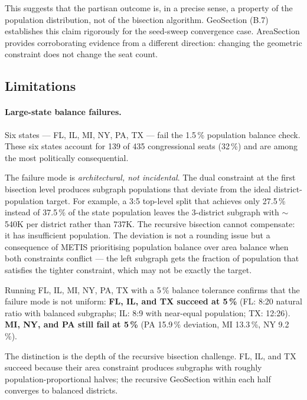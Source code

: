 This suggests that the partisan outcome is, in a precise sense, a property
of the population distribution, not of the bisection algorithm.
GeoSection (B.7) establishes this claim rigorously for the seed-sweep
convergence case.
AreaSection provides corroborating evidence from a different direction:
changing the geometric constraint does not change the seat count.

\subsection{Limitations}
\label{sec:limitations}

\paragraph{Large-state balance failures.}
Six states --- FL, IL, MI, NY, PA, TX --- fail the 1.5\,\% population balance
check.
These six states account for 139 of 435 congressional seats (32\,\%) and are
among the most politically consequential.

The failure mode is \emph{architectural, not incidental}.
The dual constraint at the first bisection level produces subgraph populations
that deviate from the ideal district-population target.
For example, a 3:5 top-level split that achieves only 27.5\,\% instead of
37.5\,\% of the state population leaves the 3-district subgraph with
$\sim$540K per district rather than 737K.
The recursive bisection cannot compensate: it has insufficient population.
The deviation is not a rounding issue but a consequence of METIS prioritising
population balance over area balance when both constraints conflict --- the
left subgraph gets the fraction of population that satisfies the tighter
constraint, which may not be exactly the target.

Running FL, IL, MI, NY, PA, TX with a 5\,\% balance tolerance confirms that the
failure mode is not uniform:
\textbf{FL, IL, and TX succeed at 5\,\%} (FL: 8:20 natural ratio with balanced
subgraphs; IL: 8:9 with near-equal population; TX: 12:26).
\textbf{MI, NY, and PA still fail at 5\,\%} (PA 15.9\,\% deviation, MI 13.3\,\%, NY 9.2\,\%).

The distinction is the depth of the recursive bisection challenge.
FL, IL, and TX succeed because their area constraint produces subgraphs with
roughly population-proportional halves; the recursive GeoSection within each
half converges to balanced districts.

